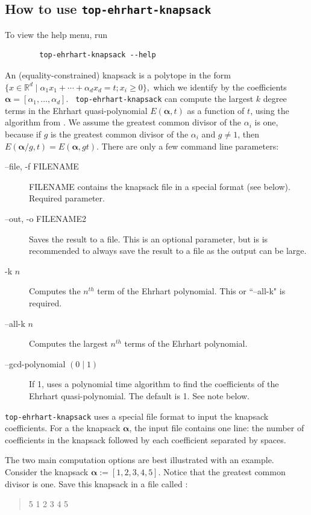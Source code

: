 \documentclass{article}
\newcommand{\R}{{\mathbb R}}
\begin{document}
\subsection{How to use {\tt top-ehrhart-knapsack}}


 To view the help menu, run

\begin{verbatim}
        top-ehrhart-knapsack --help
\end{verbatim}  

An (equality-constrained) knapsack is a polytope in the form $\{x \in \R^d \mid \alpha_1 x_1 + \cdots
+ \alpha_d x_d = t; x_i \geq 0\},$ which we identify by the coefficients
$\boldsymbol{\alpha}= [\alpha_1, \dots, \alpha_d].$   {\tt
  top-ehrhart-knapsack} can compute the largest $k$ degree terms in the
Ehrhart quasi-polynomial $E(\boldsymbol{\alpha}, t)$ as a function of $t$,
using the algorithm from
\cite{baldoni-et-al:denumerant-fpsac,baldoni-et-al:denumerant-full-paper}. 
We assume the greatest common divisor of the $\alpha_i$ is one, because if $g$ is the greatest common divisor of the $\alpha_i$ and $g\neq 1$, then $E(\boldsymbol{\alpha}/g, t) = E(\boldsymbol{\alpha}, gt) $. There are only a few command line parameters:

\begin{description}
\item[--file, -f FILENAME] FILENAME contains the knapsack file in a special format (see below). Required parameter.
\item[--out, -o FILENAME2] Saves the result to a file. This is an optional parameter, but is is recommended to always save the result to a file as the output can be large. 
\item[-k $n$] Computes the $n^{th}$ term of the Ehrhart polynomial. This or ``--all-k" is required.
\item[--all-k $n$] Computes the largest $n^{th}$ terms of the Ehrhart polynomial.  
\item[--gcd-polynomial $(0\mid 1)$] If 1, uses a polynomial time algorithm to find the coefficients of the Ehrhart quasi-polynomial. The default is 1. See note below.
\end{description}

{\tt top-ehrhart-knapsack} uses a special file format to input the knapsack coefficients. For a the knapsack $\boldsymbol{\alpha}$, the input file contains one line: the number of coefficients in the knapsack followed by each coefficient separated by spaces.

The two main computation options are best illustrated with an example. Consider the knapsack $\boldsymbol{\alpha}:=[1,2,3,4,5]$. Notice that the greatest common divisor  is one.  Save this knapsack in a file called :
\begin{verse}
5 1 2 3 4 5
\end{verse}
\end{document}
